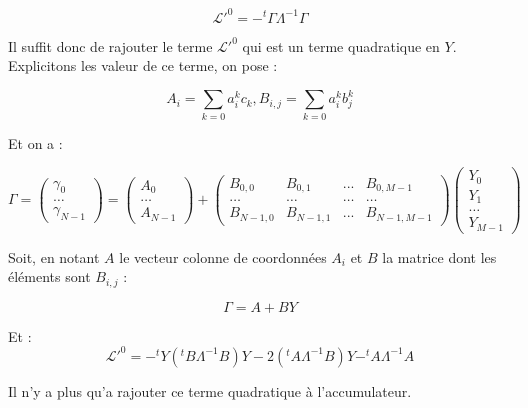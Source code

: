 \begin{equation}
     \mathcal{L}'^0 =   - ^t \Gamma  \Lambda^{-1} \Gamma 
\end{equation}

Il suffit donc de rajouter le terme $\mathcal{L}'^0$ qui est un terme
quadratique en $Y$. 
Explicitons les valeur de ce terme, on pose :


\begin{equation}
     A_i = \sum_{k=0} a^k_i  c_k ,
     B_{i,j} = \sum_{k=0} a^k_i  b^k_j
\end{equation}

Et on a :

\begin{equation}
  \Gamma = 
 \begin{pmatrix}  \gamma_0 \\ \dots   \\    \gamma_{N-1} \end{pmatrix}
 = \begin{pmatrix}  A_0 \\ \dots   \\  A_{N-1}  \end{pmatrix}
   +  \begin{pmatrix}  B_{0,0} &  B_{0,1} & ... & B_{0,M-1} \\ 
                      \dots  & \dots  & \dots & \dots   \\    
                       B_{N-1,0} &  B_{N-1,1} & ... & B_{N-1,M-1} 
      \end{pmatrix}
      \begin{pmatrix}  Y_0 \\  Y_1 \\ \dots    \\ Y_{M-1}\end{pmatrix}
\end{equation}


Soit, en notant $A$ le vecteur colonne de coordonn\'ees $A_i$ et $B$ la matrice
dont les \'el\'ements sont $B_{i,j}$ :

\begin{equation}
  \Gamma =   A + B Y
\end{equation}

Et  :
\begin{equation}
     \mathcal{L}'^0 =   -  ^t Y (^t B \Lambda^{-1} B ) Y -2 (^tA \Lambda^{-1} B) Y - ^tA \Lambda^{-1} A
\end{equation}


Il n'y a plus qu'a rajouter ce terme quadratique \`a l'accumulateur.

